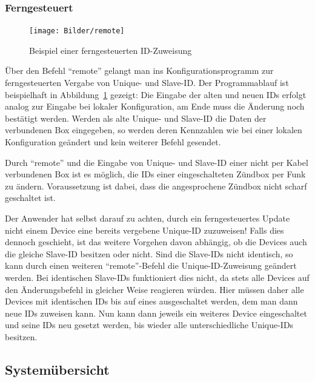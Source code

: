 \documentclass[paper=a4, parskip, numbers=noenddot, toc=listof, headsepline]{scrbook}
\begin{document}
				\subsubsection{Ferngesteuert}
					\label{subsec:remoteconf}

					\begin{figure}
						\centering
						\texttt{[image: Bilder/remote]}
						\caption{Beispiel einer ferngesteuerten ID-Zuweisung}
						\label{fig:remote}
					\end{figure}

					Über den Befehl \enquote{remote} gelangt man ins Konfigurationsprogramm zur ferngesteuerten Vergabe von Unique- und Slave-ID. Der Programmablauf ist beispielhaft in Abbildung~\ref{fig:remote} gezeigt: Die Eingabe der alten und neuen IDs erfolgt analog zur Eingabe bei lokaler Konfiguration, am Ende muss die Änderung noch bestätigt werden. Werden als alte Unique- und Slave-ID die Daten der verbundenen Box eingegeben, so werden deren Kennzahlen wie bei einer lokalen Konfiguration geändert und kein weiterer Befehl gesendet.

					Durch \enquote{remote} und die Eingabe von Unique- und Slave-ID einer nicht per Kabel verbundenen Box ist es möglich, die IDs einer eingeschalteten Zündbox per Funk zu ändern. Voraussetzung ist dabei, dass die angesprochene Zündbox nicht scharf geschaltet ist.

					Der Anwender hat selbst darauf zu achten, durch ein ferngesteuertes Update nicht einem Device eine bereits vergebene Unique-ID zuzuweisen! Falls dies dennoch geschieht, ist das weitere Vorgehen davon abhängig, ob die Devices auch die gleiche Slave-ID besitzen oder nicht. Sind die Slave-IDs nicht identisch, so kann durch einen weiteren \enquote{remote}-Befehl die Unique-ID-Zuweisung geändert werden. Bei identischen Slave-IDs funktioniert dies nicht, da stets alle Devices auf den Änderungsbefehl in gleicher Weise reagieren würden. Hier müssen daher alle Devices mit identischen IDs bis auf eines ausgeschaltet werden, dem man dann neue IDs zuweisen kann. Nun kann dann jeweils ein weiteres Device eingeschaltet und seine IDs neu gesetzt werden, bis wieder alle unterschiedliche Unique-IDs besitzen.

			\subsection{Systemübersicht}
				\label{sec:list}
\end{document}
